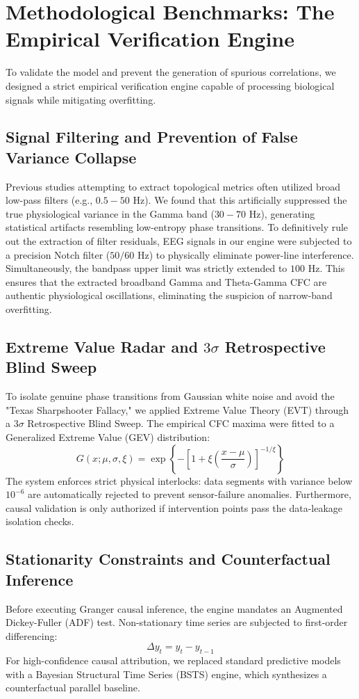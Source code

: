 \documentclass[10pt,twocolumn,letterpaper]{article}
\begin{document}
\section{Methodological Benchmarks: The Empirical Verification Engine}
To validate the model and prevent the generation of spurious correlations, we designed a strict empirical verification engine capable of processing biological signals while mitigating overfitting.

\subsection{Signal Filtering and Prevention of False Variance Collapse}
Previous studies attempting to extract topological metrics often utilized broad low-pass filters (e.g., $0.5-50$ Hz). We found that this artificially suppressed the true physiological variance in the Gamma band ($30-70$ Hz), generating statistical artifacts resembling low-entropy phase transitions. To definitively rule out the extraction of filter residuals, EEG signals in our engine were subjected to a precision Notch filter ($50/60$ Hz) to physically eliminate power-line interference. Simultaneously, the bandpass upper limit was strictly extended to $100$ Hz. This ensures that the extracted broadband Gamma and Theta-Gamma CFC are authentic physiological oscillations, eliminating the suspicion of narrow-band overfitting. 

\subsection{Extreme Value Radar and $3\sigma$ Retrospective Blind Sweep}
To isolate genuine phase transitions from Gaussian white noise and avoid the "Texas Sharpshooter Fallacy," we applied Extreme Value Theory (EVT) through a $3\sigma$ Retrospective Blind Sweep. The empirical CFC maxima were fitted to a Generalized Extreme Value (GEV) distribution:
\begin{equation}
G(x; \mu, \sigma, \xi) = \exp\left\{ -\left[ 1 + \xi \left( \frac{x - \mu}{\sigma} \right) \right]^{-1/\xi} \right\}
\end{equation}
The system enforces strict physical interlocks: data segments with variance below $10^{-6}$ are automatically rejected to prevent sensor-failure anomalies. Furthermore, causal validation is only authorized if intervention points pass the data-leakage isolation checks.

\subsection{Stationarity Constraints and Counterfactual Inference}
Before executing Granger causal inference, the engine mandates an Augmented Dickey-Fuller (ADF) test. Non-stationary time series are subjected to first-order differencing:
\begin{equation}
\Delta y_t = y_t - y_{t-1}
\end{equation}
For high-confidence causal attribution, we replaced standard predictive models with a Bayesian Structural Time Series (BSTS) engine, which synthesizes a counterfactual parallel baseline. 
\end{document}
